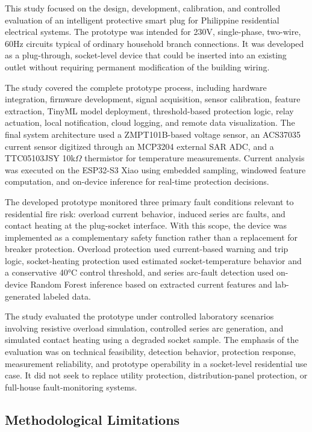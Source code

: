 This study focused on the design, development, calibration, and
controlled evaluation of an intelligent protective smart plug for
Philippine residential electrical systems. The prototype was intended
for 230V, single-phase, two-wire, 60Hz circuits typical of ordinary
household branch connections. It was developed as a plug-through,
socket-level device that could be inserted into an existing outlet
without requiring permanent modification of the building wiring.

The study covered the complete prototype process, including hardware
integration, firmware development, signal acquisition, sensor
calibration, feature extraction, TinyML model deployment,
threshold-based protection logic, relay actuation, local notification,
cloud logging, and remote data visualization. The final system
architecture used a ZMPT101B-based voltage sensor, an ACS37035 current
sensor digitized through an MCP3204 external SAR ADC, and a TTC05103JSY
10k$\Omega$ thermistor for temperature measurements. Current analysis was
executed on the ESP32-S3 Xiao using embedded sampling, windowed feature
computation, and on-device inference for real-time protection decisions.

The developed prototype monitored three primary fault conditions
relevant to residential fire risk: overload current behavior, induced
series arc faults, and contact heating at the plug-socket interface.
With this scope, the device was implemented as a complementary safety
function rather than a replacement for breaker protection. Overload
protection used current-based warning and trip logic, socket-heating
protection used estimated socket-temperature behavior and a conservative
40°C control threshold, and series arc-fault detection used on-device
Random Forest inference based on extracted current features and
lab-generated labeled data.

The study evaluated the prototype under controlled laboratory scenarios
involving resistive overload simulation, controlled series arc
generation, and simulated contact heating using a degraded socket
sample. The emphasis of the evaluation was on technical feasibility,
detection behavior, protection response, measurement reliability, and
prototype operability in a socket-level residential use case. It did not
seek to replace utility protection, distribution-panel protection, or
full-house fault-monitoring systems.

\subsection{Methodological Limitations}\label{methodological-limitations}

